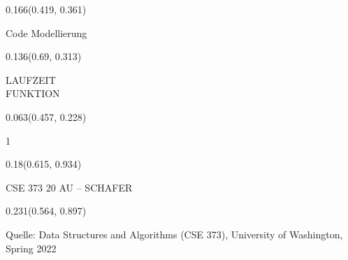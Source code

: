 \documentclass[aspectratio=169]{beamer}
\begin{document}
\begin{frame}[fragile]
  \begin{textblock}{0.166}(0.419, 0.361)
    \begin{minipage}[t][0.054\paperheight]{\linewidth}
      Code Modellierung
    \end{minipage}
  \end{textblock}
  
  \begin{textblock}{0.136}(0.69, 0.313)
    \begin{minipage}[t][0.161\paperheight]{\linewidth}
      LAUFZEIT\\FUNKTION
    \end{minipage}
  \end{textblock}
  
  \begin{textblock}{0.063}(0.457, 0.228)
    \begin{minipage}[t][0.111\paperheight]{\linewidth}
      1
    \end{minipage}
  \end{textblock}
  
  \begin{textblock}{0.18}(0.615, 0.934)
    \begin{minipage}[b][0.032\paperheight]{\linewidth}
      \raggedright
      \fontsize{3}{3.3}\selectfont CSE 373 20 AU – SCHAFER
    \end{minipage}
  \end{textblock}
  
  \begin{textblock}{0.231}(0.564, 0.897)
    \begin{minipage}[b][0.032\paperheight]{\linewidth}
      \raggedright
      \fontsize{3}{3.3}\selectfont Quelle: Data Structures and Algorithms (CSE 373), University of Washington, Spring 2022
    \end{minipage}
  \end{textblock}
\end{frame}
\end{document}
